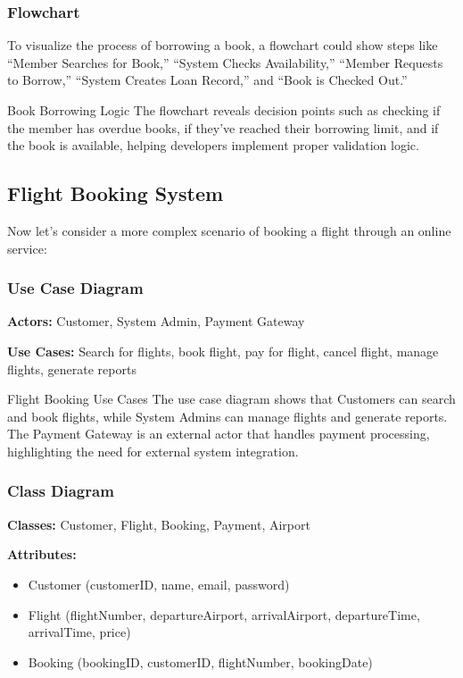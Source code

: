 \subsubsection{Flowchart}

To visualize the process of borrowing a book, a flowchart could show steps like ``Member Searches for Book,'' ``System Checks Availability,'' ``Member Requests to Borrow,'' ``System Creates Loan Record,'' and ``Book is Checked Out.''

\begin{examplecard}{Book Borrowing Logic}
  The flowchart reveals decision points such as checking if the member has overdue books, if they've reached their borrowing limit, and if the book is available, helping developers implement proper validation logic.
\end{examplecard}

\subsection{Flight Booking System}

Now let's consider a more complex scenario of booking a flight through an online service:

\subsubsection{Use Case Diagram}

\textbf{Actors:} Customer, System Admin, Payment Gateway

\textbf{Use Cases:} Search for flights, book flight, pay for flight, cancel flight, manage flights, generate reports

\begin{examplecard}{Flight Booking Use Cases}
  The use case diagram shows that Customers can search and book flights, while System Admins can manage flights and generate reports. The Payment Gateway is an external actor that handles payment processing, highlighting the need for external system integration.
\end{examplecard}

\subsubsection{Class Diagram}

\textbf{Classes:} Customer, Flight, Booking, Payment, Airport

\textbf{Attributes:}
\begin{itemize}
  \item Customer (customerID, name, email, password)
  \item Flight (flightNumber, departureAirport, arrivalAirport, departureTime, arrivalTime, price)
  \item Booking (bookingID, customerID, flightNumber, bookingDate)
\end{itemize}

